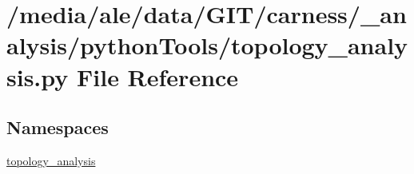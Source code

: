 \hypertarget{a00064}{\section{/media/ale/data/\-G\-I\-T/carness/\-\_\-analysis/python\-Tools/topology\-\_\-analysis.py File Reference}
\label{a00064}
}
\subsection*{Namespaces}
\begin{DoxyCompactItemize}
\item 
\hyperlink{a00128}{topology\-\_\-analysis}
\end{DoxyCompactItemize}
